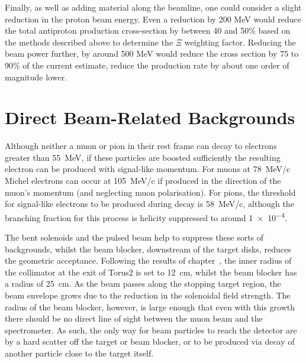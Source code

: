 Finally, as well as adding material along the beamline, one could consider a slight reduction in the proton beam energy.
Even a reduction by 200 MeV would reduce the total antiproton production cross-section by between 40 and 50\% based on the methods described above to determine the $\Xi$ weighting factor.
Reducing the beam power further, by around 500 MeV would reduce the cross section by 75 to 90\% of the current estimate, \ie reduce the production rate by about one order of magnitude lower.

\section{Direct Beam-Related Backgrounds}
Although neither a muon or pion in their rest frame can decay to electrons greater than 55~MeV, if these particles are boosted sufficiently the resulting electron can be produced with signal-like momentum.
For muons at 78~MeV/c Michel electrons can occur at 105~MeV/c if produced in the direction of the muon's momentum (and neglecting muon polarisation).
For pions, the threshold for signal-like electrons to be produced during decay is 58~MeV/c, although the branching fraction for this process is helicity suppressed to around \num{1e-4}.

The bent solenoids and the pulsed beam help to suppress these sorts of backgrounds, whilst the beam blocker, downstream of the target disks, reduces the geometric acceptance.
Following the results of chapter~, the inner radius of the collimator at the exit of Torus2 is set to 12~cm, whilst the beam blocker has a radius of 25~cm. 
As the beam passes along the stopping target region, the beam envelope grows due to the reduction in the solenoidal field strength.
The radius of the beam blocker, however, is large enough that even with this growth there should be no direct line of sight between the muon beam and the spectrometer.
As such, the only way for beam particles to reach the detector are by a hard scatter off the target or beam blocker, or to be produced via decay of another particle close to the target itself.

